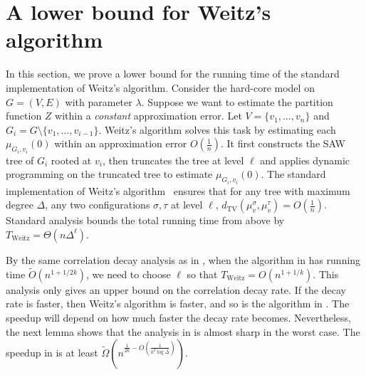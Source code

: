\documentclass[10pt,a4paper]{article}
\makeatletter
\def\listtodoname{Todo list}
\def\listoftodos{\@starttoc{tdo}\listtodoname}
\newcommand{\dTV}{d_{\mathrm{TV}}}
\makeatother
\begin{document}

\section{A lower bound for Weitz's algorithm}\label{sec:lb-Weitz}

In this section, we prove a lower bound for the running time of the standard implementation of Weitz's algorithm.
Consider the hard-core model on $G=(V,E)$ with parameter $\lambda$.
Suppose we want to estimate the partition function $Z$ within a \emph{constant} approximation error.
Let $V=\{v_1,\ldots,v_n\}$ and $G_i = G\setminus \{v_1,\ldots,v_{i-1}\}$.
Weitz's algorithm solves this task by estimating each $\mu_{G_i,v_i}(0)$ within an approximation error $ O(\frac{1}{n})$.  
It first constructs the SAW tree of $G_i$ rooted at $v_i$, then truncates the tree at level $\ell$ and applies dynamic programming on the truncated tree to estimate $\mu_{G_i,v_i}(0)$.
The standard implementation of Weitz's algorithm~\cite{Wei06,LLY13} ensures that for any tree with maximum degree $\Delta$, any two configurations $\sigma,\tau$ at level $\ell$, $\dTV(\mu_v^{\sigma},\mu_v^{\tau}) = O(\frac{1}{n})$. 
Standard analysis bounds the total running time from above by $T_{\mathrm{Weitz}} = \Theta(n \Delta^\ell)$.

By the same correlation decay analysis as in ,
when the algorithm in  has running time $\widetilde{O}(n^{1+1/2k})$,
we need to choose $\ell$ so that $T_{\mathrm{Weitz}}=O(n^{1+1/k})$.
This analysis only gives an upper bound on the correlation decay rate.
If the decay rate is faster, then Weitz's algorithm is faster,
and so is the algorithm in .
The speedup will depend on how much faster the decay rate becomes.
Nevertheless, the next lemma shows that the analysis in  is almost sharp in the worst case.
The speedup in  is at least $\widetilde{\Omega}\left(n^{\frac{1}{2k}-O(\frac{1}{k^2\log\Delta})}\right)$.

\end{document}
